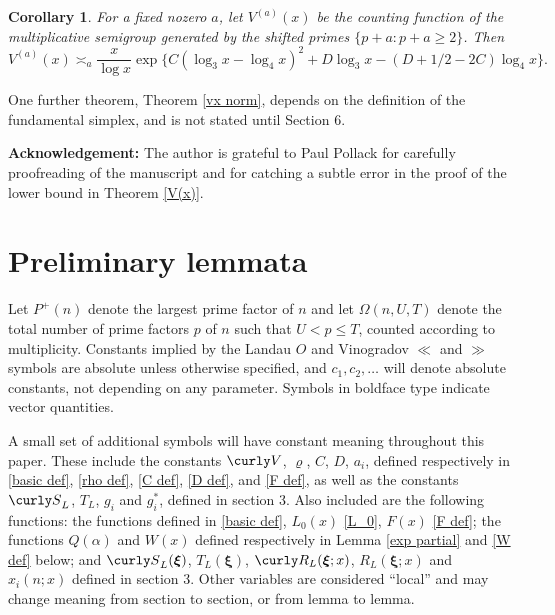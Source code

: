 \documentclass[11pt]{amsart}
\theoremstyle{remark}
\theoremstyle{plain}
\newtheorem{cor}[thm]{Corollary}
\numberwithin{equation}{section}
\renewcommand{\(}{\left(}
\renewcommand{\)}{\right)}
\newcommand{\fancyS}{{\curly S}}
\newcommand{\fancyV}{\curly V}
\renewcommand{\le}{\leqslant}
\renewcommand{\ge}{\geqslant}
\renewcommand{\rho}{\varrho}
\newcommand{\om}{\Omega}
\newcommand{\bxi}{\boldsymbol\xi}
\newcommand{\vxi}{\bxi}
\begin{document}
\begin{cor}
 For a fixed nozero $a$, let $V^{(a)}(x)$ be the counting function of the multiplicative
semigroup generated by the shifted primes $\{p+a : p+a\ge 2\}$.  Then
\[
 V^{(a)}(x) \asymp_a \frac{x}{\log x} \exp\{ C(\log_3 x-\log_4 x)^2 +D \log_3 x
- (D+1/2-2C)\log_4 x \}.
\]

\end{cor}


One further theorem, Theorem \ref{vx norm}, depends on the definition of the fundamental
simplex, and is not stated until Section 6.

\medskip

\noindent
{\bf Acknowledgement:}  The author is grateful to Paul Pollack for carefully proofreading
of the manuscript and for catching a subtle error in the proof of the lower bound in
Theorem \ref{V(x)}.


%
%
%
%



\section{Preliminary lemmata}

Let $P^+(n)$ denote the largest prime factor of $n$ and
let $\om(n,U,T)$ denote the total number of prime factors $p$ of $n$
such that $U < p \le T$, counted according to multiplicity.
Constants implied by the Landau $O$ and Vinogradov $\ll$ and $\gg$
symbols are absolute unless otherwise specified, and
 $c_1, c_2, \ldots$ will denote absolute constants, not depending
on any parameter.  Symbols in boldface type indicate vector quantities.

A small set of additional
symbols will have constant meaning throughout this paper.
These include the constants $\fancyV$, $\rho$, $C$, $D$, $a_i$,
defined respectively in \eqref{basic def}, \eqref{rho def}, \eqref{C def},
\eqref{D def}, and \eqref{F def}, as well as the constants
$\fancyS_L$, $T_L$, $g_i$ and $g_i^*$,
defined in section 3.  Also included are
the following functions:  the functions defined in \eqref{basic def},
$L_0(x)$ \eqref{L_0}, $F(x)$ \eqref{F def}; the functions
$Q(\alpha)$ and $W(x)$ defined respectively in Lemma
\ref{exp partial} and \eqref{W def} below; and 
$\fancyS_L(\bxi)$, $T_L(\bxi)$, $\curly R_L(\vxi;x)$,
$R_L(\vxi;x)$ and $x_i(n;x)$ defined in section 3.
Other variables are considered ``local'' and may change meaning from 
section to section, or from lemma to lemma. 
\end{document}
